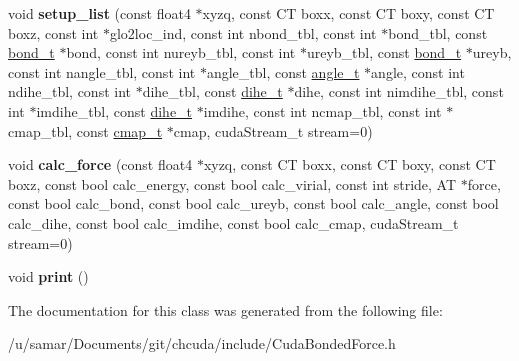 \begin{DoxyCompactItemize}
void {\bfseries setup\+\_\+list} (const float4 $\ast$xyzq, const CT boxx, const CT boxy, const CT boxz, const int $\ast$glo2loc\+\_\+ind, const int nbond\+\_\+tbl, const int $\ast$bond\+\_\+tbl, const \hyperlink{structbond__t}{bond\+\_\+t} $\ast$bond, const int nureyb\+\_\+tbl, const int $\ast$ureyb\+\_\+tbl, const \hyperlink{structbond__t}{bond\+\_\+t} $\ast$ureyb, const int nangle\+\_\+tbl, const int $\ast$angle\+\_\+tbl, const \hyperlink{structangle__t}{angle\+\_\+t} $\ast$angle, const int ndihe\+\_\+tbl, const int $\ast$dihe\+\_\+tbl, const \hyperlink{structdihe__t}{dihe\+\_\+t} $\ast$dihe, const int nimdihe\+\_\+tbl, const int $\ast$imdihe\+\_\+tbl, const \hyperlink{structdihe__t}{dihe\+\_\+t} $\ast$imdihe, const int ncmap\+\_\+tbl, const int $\ast$cmap\+\_\+tbl, const \hyperlink{structcmap__t}{cmap\+\_\+t} $\ast$cmap, cuda\+Stream\+\_\+t stream=0)
\item 
\hypertarget{classCudaBondedForce_a762489ffa9c804e654658a6f30b529dd}{}\label{classCudaBondedForce_a762489ffa9c804e654658a6f30b529dd} 
void {\bfseries calc\+\_\+force} (const float4 $\ast$xyzq, const CT boxx, const CT boxy, const CT boxz, const bool calc\+\_\+energy, const bool calc\+\_\+virial, const int stride, AT $\ast$force, const bool calc\+\_\+bond, const bool calc\+\_\+ureyb, const bool calc\+\_\+angle, const bool calc\+\_\+dihe, const bool calc\+\_\+imdihe, const bool calc\+\_\+cmap, cuda\+Stream\+\_\+t stream=0)
\item 
\hypertarget{classCudaBondedForce_a0829dcaac9739741280babcb491895d1}{}\label{classCudaBondedForce_a0829dcaac9739741280babcb491895d1} 
void {\bfseries print} ()
\end{DoxyCompactItemize}


The documentation for this class was generated from the following file\+:\begin{DoxyCompactItemize}
\item 
/u/samar/\+Documents/git/chcuda/include/Cuda\+Bonded\+Force.\+h\end{DoxyCompactItemize}
